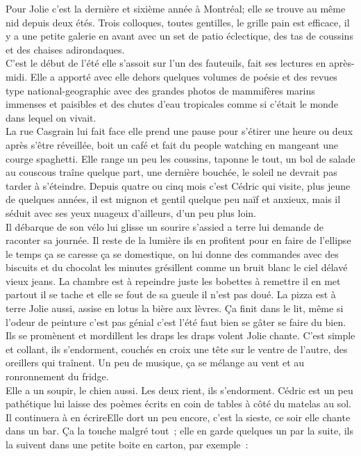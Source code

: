 Pour Jolie c’est la dernière et sixième année à Montréal; elle se
trouve au même nid depuis deux étés. Trois colloques, toutes
gentilles, le grille pain est efficace, il y a une petite galerie en
avant avec un set de patio éclectique, des tas de coussins et des
chaises adirondaques. \\

C’est le début de l’été elle s’assoit sur l’un
des fauteuils, fait ses lectures en après-midi. Elle a apporté avec
elle dehors quelques volumes de poésie et des revues type
national-geographic avec des grandes photos de mammifères marins
immenses et paisibles et des chutes d’eau tropicales comme si c’était
le monde dans lequel on vivait. \\

La rue Casgrain lui fait face elle
prend une pause pour s’étirer une heure ou deux après s’être
réveillée, boit un café et fait du people watching en mangeant une
courge spaghetti. Elle range un peu les coussins, taponne le tout, un
bol de salade au couscous traîne quelque part, une dernière bouchée,
le soleil ne devrait pas tarder à s’éteindre. Depuis quatre ou cinq
mois c’est Cédric qui visite, plus jeune de quelques années, il est
mignon et gentil quelque peu naïf et anxieux, mais il séduit avec ses
yeux nuageux d’ailleurs, d’un peu plus loin.\\

Il débarque de son vélo lui glisse un sourire s’assied a terre lui
demande de raconter sa journée. Il reste de la lumière ils en
profitent pour en faire de l’ellipse le temps ça se caresse ça se
domestique, on lui donne des commandes avec des biscuits et du
chocolat les minutes grésillent comme un bruit blanc le ciel délavé
vieux jeans. La chambre est à repeindre juste les bobettes à remettre
il en met partout il se tache et elle se fout de sa gueule il n’est
pas doué. La pizza est à terre Jolie aussi, assise en lotus la bière
aux lèvres.  Ça finit dans le lit, même si l’odeur de peinture c’est
pas génial c’est l’été faut bien se gâter se faire du bien. Ils se
promènent et mordillent les draps les draps volent Jolie chante. C’est
simple et collant, ils s’endorment, couchés en croix une tête sur le
ventre de l’autre, des oreillers qui traînent. Un peu de musique, ça
se mélange au vent et au ronronnement du fridge.\\

Elle a un soupir, le chien aussi. Les deux rient, ils s’endorment.
\clearpage
Cédric est un peu pathétique lui laisse des poèmes écrits en coin de
tables à côté du matelas au sol. Il continuera à en écrireElle dort un peu encore, c’est la
sieste, ce soir elle chante dans un bar. Ça la touche malgré tout ;
elle en garde quelques un par la suite, ils la suivent dans une petite
boite en carton, par exemple :\\


